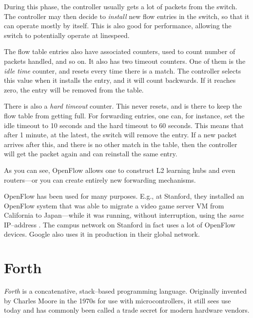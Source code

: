 During this phase, the controller usually gets a lot of packets from the
switch.  The controller may then decide to \textit{install} new flow entries
in the switch, so that it can operate mostly by itself.  This is also good
for performance, allowing the switch to potentially operate at linespeed.

The flow table entries also have associated counters, used to count number
of packets handled, and so on.  It also has two timeout counters.  One of
them is the \textit{idle time} counter, and resets every time there is a
match.  The controller selects this value when it installs the entry, and it
will count backwards.  If it reaches zero, the entry will be removed from
the table.

There is also a \textit{hard timeout} counter.  This never resets, and is
there to keep the flow table from getting full.  For forwarding entries, one
can, for instance, set the idle timeout to 10 seconds and the hard timeout
to 60 seconds.  This means that after 1 minute, at the latest, the switch
will remove the entry.  If a new packet arrives after this, and there is no
other match in the table, then the controller will get the packet again and
can reinstall the same entry.

As you can see, OpenFlow allows one to construct L2 learning hubs and even
routers---or you can create entirely new forwarding mechanisms.

OpenFlow has been used for many purposes.  E.g., at Stanford, they installed
an OpenFlow system that was able to migrate a video game server \ac{VM} from
California to Japan---while it was running, without interruption, using the
\textit{same} IP--address \cite{erickson2008demonstration}
\cite{kobayashi2013maturing}.
The campus network on Stanford in fact uses a lot of OpenFlow devices.
Google also uses it in production in their global network.

\section{Forth}

\textit{Forth} is a concatenative, stack--based programming language.
Originally invented by Charles Moore in the 1970s for use with
microcontrollers, it still sees use today and has commonly been called a
trade secret for modern hardware vendors.


